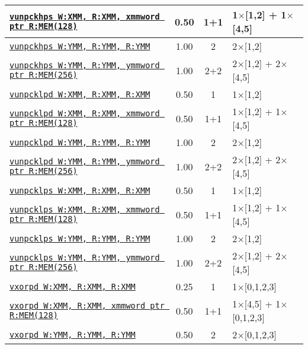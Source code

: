 \documentclass[a4paper,english,fontsize=9]{scrartcl}
\begin{document}
\begin{longtable}{p{}ccL{.25\textwidth}}
  \midrule
  \texttt{\href{https://felixcloutier.com/x86/UNPCKHPS.html}{vunpckhps W:XMM, R:XMM, xmmword ptr R:MEM(128)}} & 0.50 & 1+1 & 1\(\times\)[1,2] + 1\(\times\)[4,5] \\
  \midrule
  \texttt{\href{https://felixcloutier.com/x86/UNPCKHPS.html}{vunpckhps W:YMM, R:YMM, R:YMM}} & 1.00 & 2 & 2\(\times\)[1,2] \\
  \midrule
  \texttt{\href{https://felixcloutier.com/x86/UNPCKHPS.html}{vunpckhps W:YMM, R:YMM, ymmword ptr R:MEM(256)}} & 1.00 & 2+2 & 2\(\times\)[1,2] + 2\(\times\)[4,5] \\
  \midrule
  \texttt{\href{https://felixcloutier.com/x86/UNPCKLPD.html}{vunpcklpd W:XMM, R:XMM, R:XMM}} & 0.50 & 1 & 1\(\times\)[1,2] \\
  \midrule
  \texttt{\href{https://felixcloutier.com/x86/UNPCKLPD.html}{vunpcklpd W:XMM, R:XMM, xmmword ptr R:MEM(128)}} & 0.50 & 1+1 & 1\(\times\)[1,2] + 1\(\times\)[4,5] \\
  \midrule
  \texttt{\href{https://felixcloutier.com/x86/UNPCKLPD.html}{vunpcklpd W:YMM, R:YMM, R:YMM}} & 1.00 & 2 & 2\(\times\)[1,2] \\
  \midrule
  \texttt{\href{https://felixcloutier.com/x86/UNPCKLPD.html}{vunpcklpd W:YMM, R:YMM, ymmword ptr R:MEM(256)}} & 1.00 & 2+2 & 2\(\times\)[1,2] + 2\(\times\)[4,5] \\
  \midrule
  \texttt{\href{https://felixcloutier.com/x86/UNPCKLPS.html}{vunpcklps W:XMM, R:XMM, R:XMM}} & 0.50 & 1 & 1\(\times\)[1,2] \\
  \midrule
  \texttt{\href{https://felixcloutier.com/x86/UNPCKLPS.html}{vunpcklps W:XMM, R:XMM, xmmword ptr R:MEM(128)}} & 0.50 & 1+1 & 1\(\times\)[1,2] + 1\(\times\)[4,5] \\
  \midrule
  \texttt{\href{https://felixcloutier.com/x86/UNPCKLPS.html}{vunpcklps W:YMM, R:YMM, R:YMM}} & 1.00 & 2 & 2\(\times\)[1,2] \\
  \midrule
  \texttt{\href{https://felixcloutier.com/x86/UNPCKLPS.html}{vunpcklps W:YMM, R:YMM, ymmword ptr R:MEM(256)}} & 1.00 & 2+2 & 2\(\times\)[1,2] + 2\(\times\)[4,5] \\
  \midrule
  \texttt{\href{https://felixcloutier.com/x86/XORPD.html}{vxorpd W:XMM, R:XMM, R:XMM}} & 0.25 & 1 & 1\(\times\)[0,1,2,3] \\
  \midrule
  \texttt{\href{https://felixcloutier.com/x86/XORPD.html}{vxorpd W:XMM, R:XMM, xmmword ptr R:MEM(128)}} & 0.50 & 1+1 & 1\(\times\)[4,5] + 1\(\times\)[0,1,2,3] \\
  \midrule
  \texttt{\href{https://felixcloutier.com/x86/XORPD.html}{vxorpd W:YMM, R:YMM, R:YMM}} & 0.50 & 2 & 2\(\times\)[0,1,2,3] \\

\end{longtable}
\end{document}
